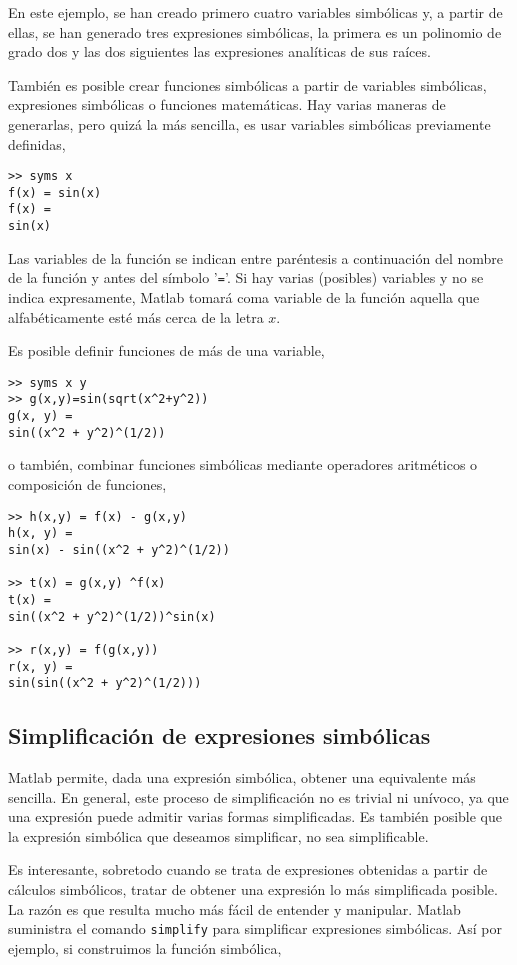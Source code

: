 En este ejemplo, se han creado primero cuatro variables simbólicas y, a partir de ellas, se han generado tres expresiones simbólicas, la primera es un polinomio de grado dos y las dos siguientes las expresiones analíticas de sus raíces.

También es posible crear funciones simbólicas a partir de variables simbólicas, expresiones simbólicas o funciones matemáticas. Hay varias maneras de generarlas, pero quizá la más sencilla, es usar variables simbólicas previamente definidas,

\begin{verbatim}
>> syms x
f(x) = sin(x)
f(x) = 
sin(x)
\end{verbatim}

Las variables de la función se indican entre paréntesis a continuación del nombre de la función y antes del símbolo '\texttt{=}'. Si hay varias (posibles) variables y no se indica expresamente, Matlab tomará coma variable de la función aquella que alfabéticamente esté más cerca de la letra $x$. 

Es posible definir funciones de más de una variable,

\begin{verbatim}
>> syms x y
>> g(x,y)=sin(sqrt(x^2+y^2)) 
g(x, y) = 
sin((x^2 + y^2)^(1/2))
\end{verbatim}

o también, combinar funciones simbólicas mediante operadores aritméticos o composición de funciones, 
\begin{verbatim}
>> h(x,y) = f(x) - g(x,y)
h(x, y) =
sin(x) - sin((x^2 + y^2)^(1/2))
 
>> t(x) = g(x,y) ^f(x) 
t(x) = 
sin((x^2 + y^2)^(1/2))^sin(x)

>> r(x,y) = f(g(x,y)) 
r(x, y) = 
sin(sin((x^2 + y^2)^(1/2)))
\end{verbatim}

\subsection{Simplificación de expresiones simbólicas}
Matlab permite, dada una expresión simbólica, obtener una equivalente más sencilla. En general, este proceso de simplificación no es trivial ni unívoco, ya que una expresión puede admitir varias formas simplificadas. Es también posible que la expresión simbólica que deseamos simplificar, no sea simplificable.

Es interesante, sobretodo cuando se trata de expresiones obtenidas a partir de cálculos simbólicos, tratar de obtener una expresión lo más simplificada posible. La razón es que resulta mucho más fácil de entender y manipular. Matlab suministra el comando \texttt{simplify} para simplificar expresiones simbólicas. Así por ejemplo, si construimos la función simbólica,

